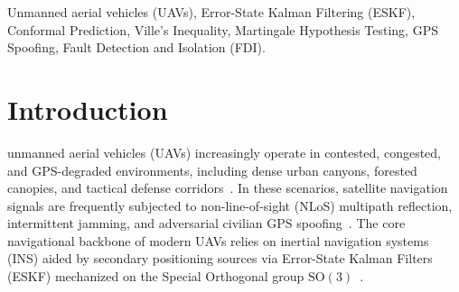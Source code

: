 \documentclass[journal,twocolumn]{IEEEtran}
\newcommand{\SO}{\mathrm{SO}(3)}
\begin{document}
\begin{IEEEkeywords}
Unmanned aerial vehicles (UAVs), Error-State Kalman Filtering (ESKF), Conformal Prediction, Ville's Inequality, Martingale Hypothesis Testing, GPS Spoofing, Fault Detection and Isolation (FDI).
\end{IEEEkeywords}

\section{Introduction}
\label{sec:intro}
 unmanned aerial vehicles (UAVs) increasingly operate in contested, congested, and GPS-degraded environments, including dense urban canyons, forested canopies, and tactical defense corridors~\cite{farrell2008aided,psiaki2016gnss,loianno2016fast}. In these scenarios, satellite navigation signals are frequently subjected to non-line-of-sight (NLoS) multipath reflection, intermittent jamming, and adversarial civilian GPS spoofing~\cite{humphreys2008assessing,tanil2018advanced}. The core navigational backbone of modern UAVs relies on inertial navigation systems (INS) aided by secondary positioning sources via Error-State Kalman Filters (ESKF) mechanized on the Special Orthogonal group $\SO$~\cite{sola2018micro,forster2016manifold,lynen2015robust}. 
\end{document}
